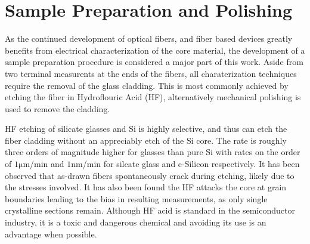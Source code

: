 
\chapter{Sample Preparation and Polishing}
As the continued development of optical fibers, and fiber based devices greatly benefits from electrical characterization of the core material, the development of a sample preparation procedure is considered a major part of this work. Aside from two terminal measurents at the ends of the fibers, all charaterization techniques require the removal of the glass cladding. This is most commonly achieved by etching the fiber in Hydroflouric Acid (HF), alternatively mechanical polishing is used to remove the cladding. %

HF etching of silicate glasses and Si is highly selective, and thus can etch the fiber cladding without an appreciably etch of the Si core. The rate is roughly three orders of magnitude higher for glasses than pure Si with rates on the order of $1\si{\micro\meter}$/min \cite{Liu2013UnexpectedlyAcid} and $1\si{\nano\meter}$/min \cite{Park2017AApplication} for silcate glass and c-Silicon respectively. It has been observed \cite{LapointeElectricalFibres} that as-drawn fibers spontaneously crack during etching, likely due to the stresses involved. It has also been found the HF attacks the core at grain boundaries leading to the bias in resulting measurements, as only single crystalline sections remain. Although HF acid is standard in the semiconductor industry, it is a toxic and dangerous chemical \cite{Product2015SafetySheet} and avoiding its use is an advantage when possible.  %

